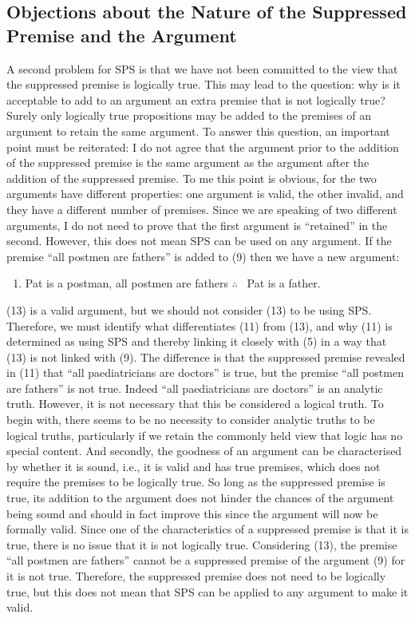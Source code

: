 \subsection*{Objections about the Nature of the Suppressed Premise and the
Argument}

A second problem for SPS is that we have not been committed to the view
that the suppressed premise is logically true. This may lead to the
question: why is it acceptable to add to an argument an extra premise
that is not logically true? Surely only logically true propositions may
be added to the premises of an argument to retain the same argument. To
answer this question, an important point must be reiterated: I do not
agree that the argument prior to the addition of the suppressed premise
is the same argument as the argument after the addition of the
suppressed premise. To me this point is obvious, for the two arguments
have different properties: one argument is valid, the other invalid, and
they have a different number of premises. Since we are speaking of two
different arguments, I do not need to prove that the first argument is
``retained'' in the second. However, this does not mean SPS can be used
on any argument. If the premise ``all postmen are fathers'' is added to
(9) then we have a new argument:

\begin{enumerate}[leftmargin=42] 
\def\labelenumi{(\arabic{enumi})}
\setcounter{enumi}{12}
\item
  Pat is a postman, all postmen are fathers $\therefore$ \ Pat is a father.
\end{enumerate}

\noindent (13) is a valid argument, but we should not consider (13) to be using SPS. Therefore, we must identify what differentiates (11) from (13), and
why (11) is determined as using SPS and thereby linking it closely with
(5) in a way that (13) is not linked with (9). The difference is that
the suppressed premise revealed in (11) that ``all paediatricians are
doctors'' is true, but the premise ``all postmen are fathers'' is not
true. Indeed ``all paediatricians are doctors'' is an analytic truth.
However, it is not necessary that this be considered a logical truth. To
begin with, there seems to be no necessity to consider analytic truths
to be logical truths, particularly if we retain the commonly held view
that logic has no special content. And secondly, the goodness of an
argument can be characterised by whether it is sound, i.e., it is valid
and has true premises, which does not require the premises to be
logically true. So long as the suppressed premise is true, its addition
to the argument does not hinder the chances of the argument being sound
and should in fact improve this since the argument will now be formally
valid. Since one of the characteristics of a suppressed premise is that
it is true, there is no issue that it is not logically true. Considering
(13), the premise ``all postmen are fathers'' cannot be a suppressed
premise of the argument (9) for it is not true. Therefore, the
suppressed premise does not need to be logically true, but this does not
mean that SPS can be applied to any argument to make it valid.

